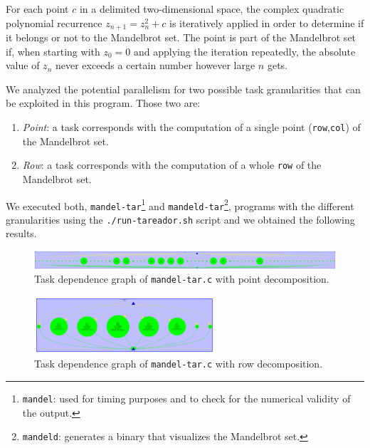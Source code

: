 For each point $c$ in a delimited two-dimensional space, the complex quadratic polynomial recurrence $z_{n+1} = z^2_n + c$ is iteratively applied in order to determine if it belongs or not to the Mandelbrot set.  The point is part of the Mandelbrot set if, when starting with $z_0 = 0$ and applying the iteration repeatedly, the absolute value of $z_n$ never exceeds a certain number however large $n$ gets.

We analyzed the potential parallelism for two possible task granularities that can be exploited in this program. Those two are:
\begin{enumerate}[label=\alph*)]
\item \emph{Point}: a task corresponds with the computation of a single point (\texttt{row},\texttt{col}) of the Mandelbrot set.
\item \emph{Row}: a task corresponds with the computation of a whole \texttt{row} of the Mandelbrot set.
\end{enumerate}

We executed both, \texttt{mandel-tar}\footnote{\texttt{mandel}: used for timing purposes and to check for the numerical validity of the output.} and \texttt{mandeld-tar}\footnote{\texttt{mandeld}: generates a binary that visualizes the Mandelbrot set.}, programs with the different granularities using the \texttt{./run-tareador.sh} script and we obtained the following results.

\begin{figure}[H]
\centering
\includegraphics[width=\textwidth]{plots/dependency_graph_mandel_point.png}
\caption{Task dependence graph of \texttt{mandel-tar.c} with point decomposition.}
\label{graph:mandel_point}
\end{figure}

\begin{figure}[H]
\centering
\includegraphics[width=0.6\textwidth]{plots/dependency_graph_mandel_row.pdf}
\caption{Task dependence graph of \texttt{mandel-tar.c} with row decomposition.}
\label{graph:mandel_row}
\end{figure}

